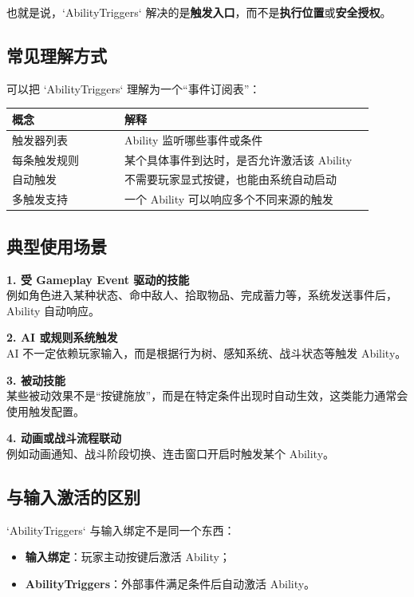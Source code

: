 \documentclass[10pt,CJKmath]{ctexart}
\begin{document}
也就是说，`AbilityTriggers` 解决的是\textbf{触发入口}，而不是\textbf{执行位置}或\textbf{安全授权}。

\subsection{常见理解方式}

可以把 `AbilityTriggers` 理解为一个“事件订阅表”：

	\begin{longtable}{|p{0.28\linewidth}|p{0.62\linewidth}|}
		\hline
		\textbf{概念} & \textbf{解释} \\
		\hline
		触发器列表 & Ability 监听哪些事件或条件 \\
		\hline
		每条触发规则 & 某个具体事件到达时，是否允许激活该 Ability \\
		\hline
		自动触发 & 不需要玩家显式按键，也能由系统自动启动 \\
		\hline
		多触发支持 & 一个 Ability 可以响应多个不同来源的触发\\		
	\end{longtable}

\subsection{典型使用场景}

\textbf{1. 受 Gameplay Event 驱动的技能}\\
例如角色进入某种状态、命中敌人、拾取物品、完成蓄力等，系统发送事件后，Ability 自动响应。

\textbf{2. AI 或规则系统触发}\\
AI 不一定依赖玩家输入，而是根据行为树、感知系统、战斗状态等触发 Ability。

\textbf{3. 被动技能}\\
某些被动效果不是“按键施放”，而是在特定条件出现时自动生效，这类能力通常会使用触发配置。

\textbf{4. 动画或战斗流程联动}\\
例如动画通知、战斗阶段切换、连击窗口开启时触发某个 Ability。

\subsection{与输入激活的区别}

`AbilityTriggers` 与输入绑定不是同一个东西：

\begin{itemize}
	\item \textbf{输入绑定}：玩家主动按键后激活 Ability；
	\item \textbf{AbilityTriggers}：外部事件满足条件后自动激活 Ability。
\end{itemize}
\end{document}
